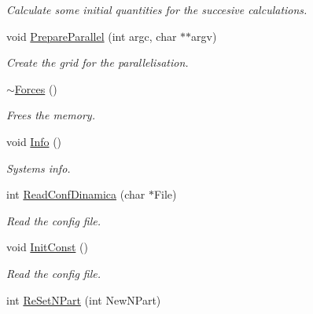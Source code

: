 \begin{DoxyCompactItemize}
\begin{DoxyCompactList}\small\item\em Calculate some initial quantities for the succesive calculations. \end{DoxyCompactList}\item 
void \hyperlink{classForces_afb0db3e5d9d3ca56511f4942b695a33c}{Prepare\+Parallel} (int argc, char $\ast$$\ast$argv)\hypertarget{classForces_afb0db3e5d9d3ca56511f4942b695a33c}{}\label{classForces_afb0db3e5d9d3ca56511f4942b695a33c}

\begin{DoxyCompactList}\small\item\em Create the grid for the parallelisation. \end{DoxyCompactList}\item 
\hyperlink{classForces_ad23deb6f28e0c4e08e69556f04028e82}{$\sim$\+Forces} ()\hypertarget{classForces_ad23deb6f28e0c4e08e69556f04028e82}{}\label{classForces_ad23deb6f28e0c4e08e69556f04028e82}

\begin{DoxyCompactList}\small\item\em Frees the memory. \end{DoxyCompactList}\item 
void \hyperlink{classForces_a632d50bc6acb5d08614d0f99a7ed7293}{Info} ()\hypertarget{classForces_a632d50bc6acb5d08614d0f99a7ed7293}{}\label{classForces_a632d50bc6acb5d08614d0f99a7ed7293}

\begin{DoxyCompactList}\small\item\em System\textquotesingle{}s info. \end{DoxyCompactList}\item 
int \hyperlink{classForces_a54e451b95d534ac661b873f7c5773435}{Read\+Conf\+Dinamica} (char $\ast$File)\hypertarget{classForces_a54e451b95d534ac661b873f7c5773435}{}\label{classForces_a54e451b95d534ac661b873f7c5773435}

\begin{DoxyCompactList}\small\item\em Read the config file. \end{DoxyCompactList}\item 
void \hyperlink{classForces_a2d9aa5d817b97aecdc4dc418d1be255c}{Init\+Const} ()\hypertarget{classForces_a2d9aa5d817b97aecdc4dc418d1be255c}{}\label{classForces_a2d9aa5d817b97aecdc4dc418d1be255c}

\begin{DoxyCompactList}\small\item\em Read the config file. \end{DoxyCompactList}\item 
int \hyperlink{classForces_a2bd0476e620e68ae04990018f4520bf6}{Re\+Set\+N\+Part} (int New\+N\+Part)\hypertarget{classForces_a2bd0476e620e68ae04990018f4520bf6}{}\label{classForces_a2bd0476e620e68ae04990018f4520bf6}


\end{DoxyCompactItemize}
